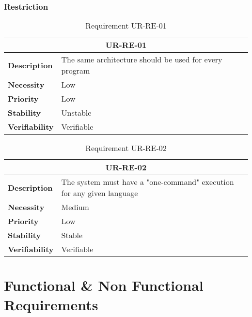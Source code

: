 \subsubsection{Restriction}

\begin{table}[H]
    \centering
    \begin{tabular}{l p{10cm}}
        \toprule
        \multicolumn{2}{c}{UR-RE-01} \\
        \toprule
        \textbf{Description}        &  The same architecture should be used for every program \\
        \textbf{Necessity}          &  Low \\
        \textbf{Priority}           &  Low \\
        \textbf{Stability}          &  Unstable \\
        \textbf{Verifiability}      &  Verifiable \\
    \end{tabular}
    \caption{Requirement UR-RE-01}
    \label{tab:ur-re-01}
\end{table}

\begin{table}[H]
    \centering
    \begin{tabular}{l p{10cm}}
        \toprule
        \multicolumn{2}{c}{UR-RE-02} \\
        \toprule
        \textbf{Description}        & The system must have a "one-command" execution for any given language \\
        \textbf{Necessity}          & Medium   \\
        \textbf{Priority}           & Low   \\
        \textbf{Stability}          & Stable \\
        \textbf{Verifiability}      & Verifiable \\
    \end{tabular}
    \caption{Requirement UR-RE-02}
    \label{tab:ur-re-02}
\end{table}


\section{Functional \& Non Functional Requirements}

